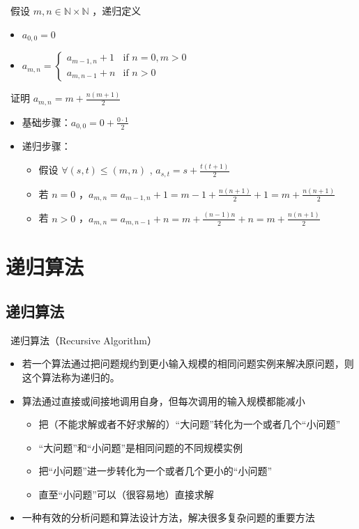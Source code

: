 \documentclass[UTF8]{report}
\theoremstyle{MyLineTheoremStyle} %
\theoremstyle{MyBlockTheoremStyle} %
\theoremstyle{MySubsubsectionStyle} %
\begin{document}
\textbullet\ 假设 $m, n \in \mathbb{N} \times \mathbb{N}$ ，递归定义
\begin{itemize}
    \item $a_{0,0} = 0$
    \item $a_{m,n} = \begin{cases} 
        a_{m-1,n} + 1 & \text{if } n = 0 ,m > 0 \\
        a_{m,n-1} + n & \text{if } n > 0 
    \end{cases}$
\end{itemize}

\textbullet\ 证明 $a_{m,n} = m + \frac{n(m + 1)}{2}$
\begin{itemize}
    \item 基础步骤：$a_{0,0} = 0 + \frac{0 \cdot 1}{2}$
    \item 递归步骤：
    \begin{itemize}
        \item 假设 $\forall (s,t) \leq (m, n)$ , $a_{s,t} = s + \frac{t(t + 1)}{2}$
        \item 若 $n = 0$ ，$a_{m,n} = a_{m-1,n} + 1 = m - 1 +\frac{n(n+1)}{2} + 1 = m + \frac{n(n + 1)}{2}$
        \item 若 $n > 0$ ，$a_{m,n} = a_{m,n-1} + n = m + \frac{(n-1)n}{2} + n = m + \frac{n(n + 1)}{2}$
    \end{itemize}
\end{itemize}

\section{递归算法}

\subsection{递归算法}

\textbullet\ 递归算法（Recursive Algorithm）
\begin{itemize}
    \item 若一个算法通过把问题规约到更小输入规模的相同问题实例来解决原问题，则这个算法称为递归的。
    \item 算法通过直接或间接地调用自身，但每次调用的输入规模都能减小
    \begin{itemize}
        \item 把（不能求解或者不好求解的）“大问题”转化为一个或者几个“小问题”
        \item “大问题”和“小问题”是相同问题的不同规模实例
        \item 把“小问题”进一步转化为一个或者几个更小的“小问题”
        \item 直至“小问题”可以（很容易地）直接求解
    \end{itemize}
    \item 一种有效的分析问题和算法设计方法，解决很多复杂问题的重要方法
\end{itemize}
\end{document}
